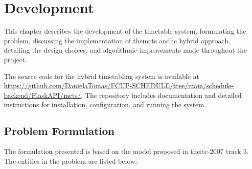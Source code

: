\pretocmd{\chapter}{\glsresetall}{}{}


\chapter{Development}


\label{Development}

This chapter describes the development of the timetable system, formulating the problem, discussing the implementation of the\ac{mcts} and\ac{hc} hybrid approach, detailing the design choices, and algorithmic improvements made throughout the project. 

The source code for the hybrid timetabling system is available at \url{https://github.com/DanielaTomas/FCUP-SCHEDULE/tree/main/schedule-backend/FlaskAPI/mcts/}. The repository includes documentation and detailed instructions for installation, configuration, and running the system.

\section{Problem Formulation}

The formulation presented is based on the model proposed in the\ac{itc-2007} track 3. The entities in the problem are listed below:

